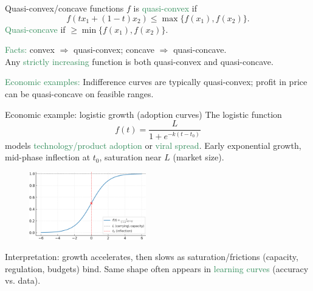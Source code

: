 \documentclass[11pt,aspectratio=169]{beamer}
\begin{document}
\begin{frame}{Quasi-convex/concave functions}
$f$ is \textcolor{SeaGreen}{quasi-convex} if
\[
f(tx_1+(1-t)x_2)\le \max\{f(x_1),f(x_2)\}.
\]
\textcolor{SeaGreen}{Quasi-concave} if $\ge \min\{f(x_1),f(x_2)\}$.
\bigskip

\textcolor{SeaGreen}{Facts:} convex $\Rightarrow$ quasi-convex; concave $\Rightarrow$ quasi-concave.\\[4mm]
Any \textcolor{SeaGreen}{strictly increasing} function is both quasi-convex and quasi-concave.\\[4mm]
\smallskip

\textcolor{SeaGreen}{Economic examples:} Indifference curves are typically quasi-convex; profit in price can be quasi-concave on feasible ranges.
\end{frame}

\begin{frame}{Economic example: logistic growth (adoption curves)}
The logistic function 
\[
f(t) = \frac{L}{1 + e^{-k(t - t_0)}}
\]
models \textcolor{SeaGreen}{technology/product adoption} or \textcolor{SeaGreen}{viral spread}. Early exponential growth, mid-phase inflection at $t_0$, saturation near $L$ (market size).
\begin{minipage}{6cm}{}
	\begin{figure}
\includegraphics[width=2in]{img/returns1.png} 
\end{figure}
\end{minipage}\begin{minipage}{9cm}{}
\small
Interpretation: growth accelerates, then slows as saturation/frictions (capacity, regulation, budgets) bind. Same shape often appears in \textcolor{SeaGreen}{learning curves} (accuracy vs. data).
\end{minipage}
\end{frame}
\end{document}
